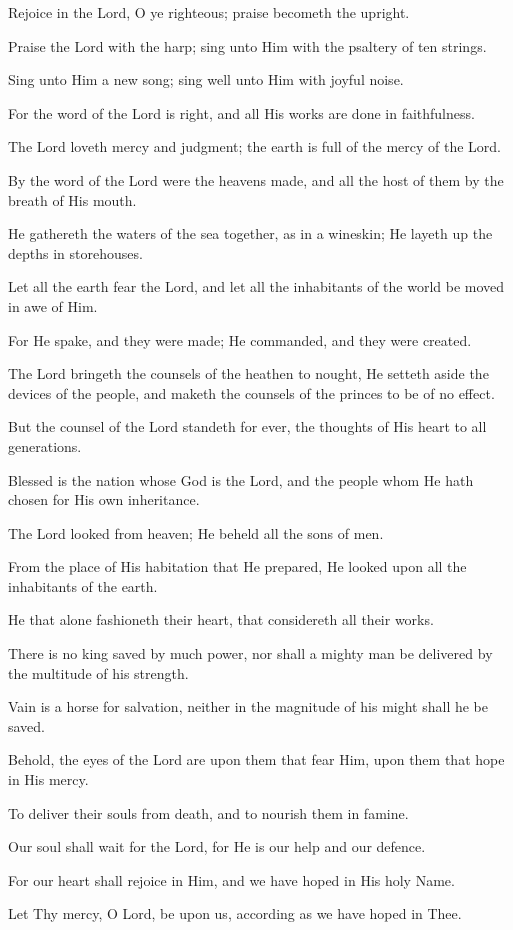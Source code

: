Rejoice in the Lord, O ye righteous; praise becometh the upright.

Praise the Lord with the harp; sing unto Him with the psaltery of ten strings.

Sing unto Him a new song; sing well unto Him with joyful noise.

For the word of the Lord is right, and all His works are done in faithfulness.

The Lord loveth mercy and judgment; the earth is full of the mercy of the Lord.

By the word of the Lord were the heavens made, and all the host of them by the breath of His mouth.

He gathereth the waters of the sea together, as in a wineskin; He layeth up the depths in storehouses.

Let all the earth fear the Lord, and let all the inhabitants of the world be moved in awe of Him.

For He spake, and they were made; He commanded, and they were created.

The Lord bringeth the counsels of the heathen to nought, He setteth aside the devices of the people, and maketh the counsels of the princes to be of no effect.

But the counsel of the Lord standeth for ever, the thoughts of His heart to all generations.

Blessed is the nation whose God is the Lord, and the people whom He hath chosen for His own inheritance.

The Lord looked from heaven; He beheld all the sons of men.

From the place of His habitation that He prepared, He looked upon all the inhabitants of the earth.

He that alone fashioneth their heart, that considereth all their works.

There is no king saved by much power, nor shall a mighty man be delivered by the multitude of his strength.

Vain is a horse for salvation, neither in the magnitude of his might shall he be saved.

Behold, the eyes of the Lord are upon them that fear Him, upon them that hope in His mercy.

To deliver their souls from death, and to nourish them in famine.

Our soul shall wait for the Lord, for He is our help and our defence.

For our heart shall rejoice in Him, and we have hoped in His holy Name.

Let Thy mercy, O Lord, be upon us, according as we have hoped in Thee.
